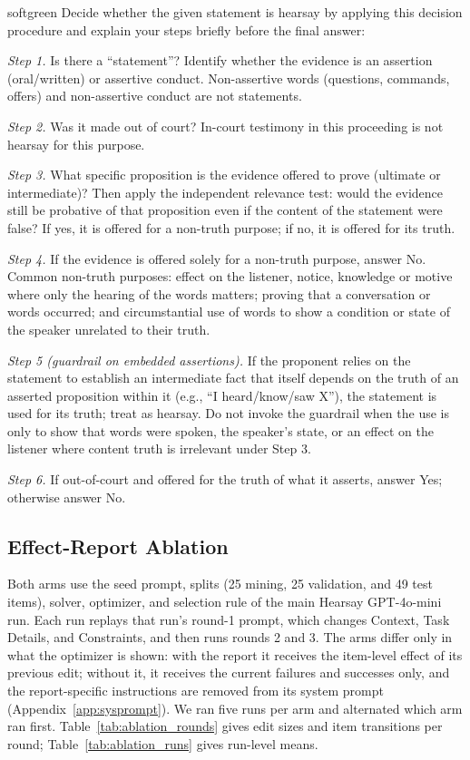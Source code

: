 \documentclass[11pt]{article}
\begin{document}
\begin{promptbox}[title={\textbf{Hearsay: returned Task Details} (round 2 excerpt)},fontupper=\small]{softgreen}
Decide whether the given statement is hearsay by applying this decision procedure and explain your steps
briefly before the final answer:\par
\textit{Step 1.} Is there a ``statement''? Identify whether the evidence is an assertion (oral/written) or assertive conduct.
Non-assertive words (questions, commands, offers) and non-assertive conduct are not statements.\par
\textit{Step 2.} Was it made out of court? In-court testimony in this proceeding is not hearsay for this purpose.\par
\textit{Step 3.} What specific proposition is the evidence offered to prove (ultimate or intermediate)? Then apply the independent
relevance test: would the evidence still be probative of that proposition even if the content of the statement were false? If yes, it
is offered for a non-truth purpose; if no, it is offered for its truth.\par
\textit{Step 4.} If the evidence is offered solely for a non-truth purpose, answer No. Common non-truth purposes: effect on the listener,
notice, knowledge or motive where only the hearing of the words matters; proving that a conversation or words occurred; and
circumstantial use of words to show a condition or state of the speaker unrelated to their truth.\par
\textit{Step 5 (guardrail on embedded assertions).} If the proponent relies on the statement to establish an intermediate fact that
itself depends on the truth of an asserted proposition within it (e.g., ``I heard/know/saw X''), the statement is used for its
truth; treat as hearsay. Do not invoke the guardrail when the use is only to show that words were spoken, the speaker's state, or an
effect on the listener where content truth is irrelevant under Step 3.\par
\textit{Step 6.} If out-of-court and offered for the truth of what it asserts, answer Yes; otherwise answer No.
\end{promptbox}

\FloatBarrier
\subsection{Effect-Report Ablation}
\label{app:ablation}
Both arms use the seed prompt, splits (25 mining, 25 validation, and 49 test items), solver, optimizer, and selection
rule of the main Hearsay GPT-4o-mini run. Each run replays that run's round-1 prompt, which changes Context, Task
Details, and Constraints, and then runs rounds 2 and 3. The arms differ only in what the optimizer is shown: with the
report it receives the item-level effect of its previous edit; without it, it receives the current failures and
successes only, and the report-specific instructions are removed from its system prompt (Appendix~\ref{app:sysprompt}).
We ran five runs per arm and alternated which arm ran first. Table~\ref{tab:ablation_rounds} gives edit sizes and item
transitions per round; Table~\ref{tab:ablation_runs} gives run-level means.
\end{document}
